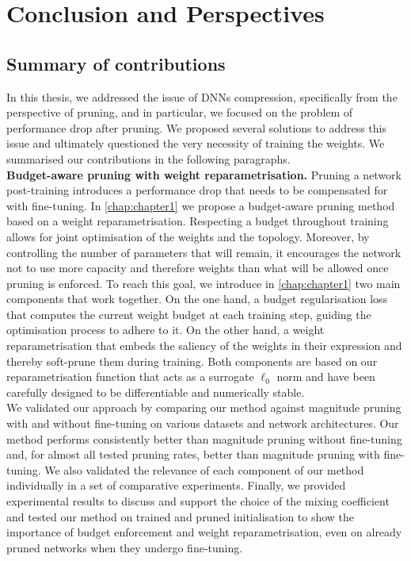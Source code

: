 \chapter{Conclusion and Perspectives}

\section{Summary of contributions}

In this thesis, we addressed the issue of \aclp{DNN} compression, specifically
from the perspective of pruning, and in particular, we focused on the problem of
performance drop after pruning. We proposed several solutions to address this
issue and ultimately questioned the very necessity of training the weights. We
summarised our contributions in the following paragraphs.\\

\noindent \textbf{Budget-aware pruning with weight reparametrisation.} Pruning a
network post-training introduces a performance drop that needs to be compensated
for with fine-tuning. In \cref{chap:chapter1} we propose a budget-aware pruning
method based on a weight reparametrisation. Respecting a budget throughout
training allows for joint optimisation of the weights and the topology.
Moreover, by controlling the number of parameters that will remain, it
encourages the network not to use more capacity and therefore weights than what
will be allowed once pruning is enforced.  To reach this goal, we introduce in
\cref{chap:chapter1} two main components that work together. On the one hand, a
budget regularisation loss that computes the current weight budget at each
training step, guiding the optimisation process to adhere to it. On the other
hand, a weight reparametrisation that embeds the saliency of the weights in
their expression and thereby soft-prune them during training. Both components
are based on our reparametrisation function that acts as a surrogate $\ell_0$
norm and have been carefully designed to be differentiable and numerically
stable.\\

We validated our approach by comparing our method against magnitude pruning with
and without fine-tuning on various datasets and network architectures. Our
method performs consistently better than magnitude pruning without fine-tuning
and, for almost all tested pruning rates, better than magnitude pruning with
fine-tuning. We also validated the relevance of each component of our method
individually in a set of comparative experiments. Finally, we provided
experimental results to discuss and support the choice of the mixing coefficient
and tested our method on trained and pruned initialisation to show the
importance of budget enforcement and weight reparametrisation, even on already
pruned networks when they undergo fine-tuning.\\

